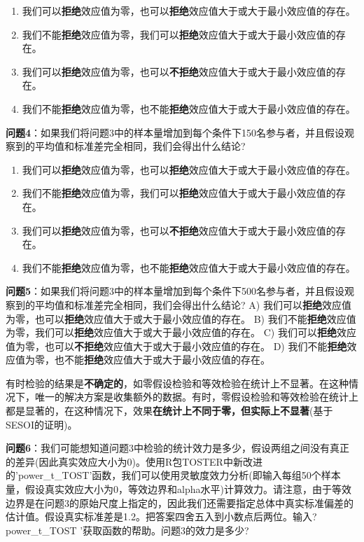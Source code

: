 \documentclass[
  letterpaper,
  DIV=11,
  numbers=noendperiod]{scrreprt}
\providecommand{\tightlist}{%
  \setlength{\itemsep}{0pt}\setlength{\parskip}{0pt}}\usepackage{longtable,booktabs,array}
\begin{document}
\begin{enumerate}
\def\labelenumi{\Alph{enumi})}
\tightlist
\item
  我们可以\textbf{拒绝}效应值为零，也可以\textbf{拒绝}效应值大于或大于最小效应值的存在。
\item
  我们不能\textbf{拒绝}效应值为零，我们可以\textbf{拒绝}效应值大于或大于最小效应值的存在。
\item
  我们可以\textbf{拒绝}效应值为零，也可以\textbf{不拒绝}效应值大于或大于最小效应值的存在。
\item
  我们不能\textbf{拒绝}效应值为零，也不能\textbf{拒绝}效应值大于或大于最小效应值的存在。
\end{enumerate}

\textbf{问题4}：如果我们将问题3中的样本量增加到每个条件下150名参与者，并且假设观察到的平均值和标准差完全相同，我们会得出什么结论?

\begin{enumerate}
\def\labelenumi{\Alph{enumi})}
\tightlist
\item
  我们可以\textbf{拒绝}效应值为零，也可以\textbf{拒绝}效应值大于或大于最小效应值的存在。
\item
  我们不能\textbf{拒绝}效应值为零，我们可以\textbf{拒绝}效应值大于或大于最小效应值的存在。
\item
  我们可以\textbf{拒绝}效应值为零，也可以\textbf{不拒绝}效应值大于或大于最小效应值的存在。
\item
  我们不能\textbf{拒绝}效应值为零，也不能\textbf{拒绝}效应值大于或大于最小效应值的存在。
\end{enumerate}

\textbf{问题5}：如果我们将问题3中的样本量增加到每个条件下500名参与者，并且假设观察到的平均值和标准差完全相同，我们会得出什么结论?
A)
我们可以\textbf{拒绝}效应值为零，也可以\textbf{拒绝}效应值大于或大于最小效应值的存在。
B)
我们不能\textbf{拒绝}效应值为零，我们可以\textbf{拒绝}效应值大于或大于最小效应值的存在。
C)
我们可以\textbf{拒绝}效应值为零，也可以\textbf{不拒绝}效应值大于或大于最小效应值的存在。
D)
我们不能\textbf{拒绝}效应值为零，也不能\textbf{拒绝}效应值大于或大于最小效应值的存在。

有时检验的结果是\textbf{不确定的}，如零假设检验和等效检验在统计上不显著。在这种情况下，唯一的解决方案是收集额外的数据。有时，零假设检验和等效检验在统计上都是显著的，在这种情况下，效果\textbf{在统计上不同于零，但实际上不显著}(基于SESOI的证明)。

\textbf{问题6}：我们可能想知道问题3中检验的统计效力是多少，假设两组之间没有真正的差异(因此真实效应大小为0)。使用R包TOSTER中新改进的'power\_t\_TOST'函数，我们可以使用灵敏度效力分析(即输入每组50个样本量，假设真实效应大小为0，等效边界和alpha水平)计算效力。请注意，由于等效边界是在问题3的原始尺度上指定的，因此我们还需要指定总体中真实标准偏差的估计值。假设真实标准差是1.2。把答案四舍五入到小数点后两位。输入?power\_t\_TOST
'获取函数的帮助。问题3的效力是多少?
\end{document}
